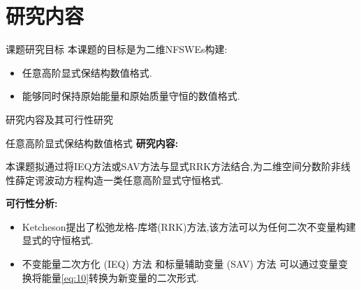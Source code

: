 \documentclass[aspectratio=169]{beamer}
\begin{document}
\section{研究内容}
\begin{frame}{课题研究目标}
	本课题的目标是为二维NFSWEs构建:
	\begin{itemize}
		\item 任意高阶显式保结构数值格式.
		\item 能够同时保持原始能量和原始质量守恒的数值格式.
	\end{itemize}

\end{frame}

\begin{frame}{研究内容及其可行性研究}
	\begin{block}{任意高阶显式保结构数值格式}
		\textbf{\textcolor[rgb]{0.227,0.373,0.306}{研究内容:}}
		
		{\footnotesize 本课题拟通过将IEQ方法或SAV方法与显式RRK方法结合,为二维空间分数阶非线性薛定谔波动方程构造一类任意高阶显式守恒格式.}
		
		\textbf{\textcolor[rgb]{0.227,0.373,0.306}{可行性分析:}}
		\begin{itemize}
			\item {\footnotesize Ketcheson\cite{ketchesonRelaxationRungeKutta2019}提出了松弛龙格-库塔(RRK)方法,该方法可以为任何二次不变量构建显式的守恒格式.}%
			\item {\footnotesize 不变能量二次方化 (IEQ) 方法 \cite{yangLinearUnconditionallyEnergy2017, yangEfficientLinearSchemes2017}和标量辅助变量 (SAV) 方法 \cite{chengConvergenceEnergyconservingScheme2022} 可以通过变量变换将能量\eqref{eq:10}转换为新变量的二次形式.}
			\end{itemize}
	\end{block}
	\end{frame}
\end{document}
